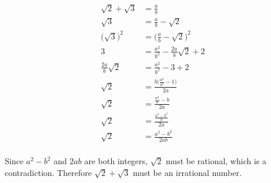 \documentclass[10pt]{article}
\begin{document}
\begin{align*}
    && \sqrt{2} + \sqrt{3} &= \frac{a}{b} && \\
    && \sqrt{3} &= \frac{a}{b} - \sqrt{2} && \\
    && \big(\sqrt{3}\big)^2 &= \Big(\frac{a}{b} - \sqrt{2}\Big)^2 && \\
    && 3 &= \frac{a^2}{b^2} - \frac{2a}{b}\sqrt{2} + 2 && \\
    && \frac{2a}{b}\sqrt{2} &= \frac{a^2}{b^2} - 3 + 2 && \\
    && \sqrt{2} &= \frac{b\Big(\frac{a^2}{b^2} - 1\Big)}{2a} && \\
    && \sqrt{2} &= \frac{\frac{a^2}{b} - b}{2a} && \\
    && \sqrt{2} &= \frac{\frac{a^2 - b^2}{b}}{2a} && \\
    && \sqrt{2} &= \frac{a^2 - b^2}{2ab} && \\
\end{align*}

Since $a^2 - b^2$ and $2ab$ are both integers, $\sqrt{2}$ must be rational, which is a contradiction.  Therefore $\sqrt{2} + \sqrt{3}$
must be an irrational number.
\end{document}
